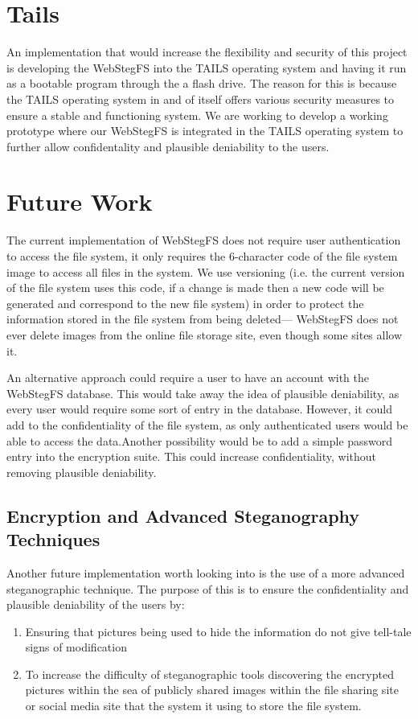 \documentclass[12pt,journal,compsoc]{IEEEtran}
\begin{document}


\section{Tails}

An implementation that would increase the flexibility and security of this project is developing the WebStegFS into the TAILS operating system and having it run as a bootable program through the a flash drive. The reason for this is because the TAILS operating system in and of itself offers various security measures to ensure a stable and functioning system. We are working to develop a working prototype where our WebStegFS is integrated in the TAILS operating system to further allow confidentality and plausible deniability to the users. 

\section{Future Work}
The current implementation of WebStegFS does not require user authentication to access the file system, it only requires the 6-character code of the file system image to access all files in the system. We use versioning (i.e. the current version of the file system uses this code, if a change is made then a new code will be generated and correspond to the new file system) in order to protect the information stored in the file system from being deleted--- WebStegFS does not ever delete images from the online file storage site, even though some sites allow it. 

An alternative approach could require a user to have an account with the WebStegFS database. This would take away the idea of plausible deniability, as every user would require some sort of entry in the database. However, it could add to the confidentiality of the file system, as only authenticated users would be able to access the data.Another possibility would be to add a simple password entry into the encryption suite. This could increase confidentiality, without removing plausible deniability.

\subsection{Encryption and Advanced Steganography Techniques}

Another future implementation worth looking into is the use of a more advanced steganographic technique. The purpose of this is to ensure the confidentiality and plausible deniability of the users by:
\begin{enumerate}
\item Ensuring that pictures being used to hide the information do not give tell-tale signs of modification
\item To increase the difficulty of steganographic tools discovering the encrypted pictures within the sea of publicly shared images within the file sharing site or social media site that the system it using to store the file system.
\end{enumerate}
\end{document}
